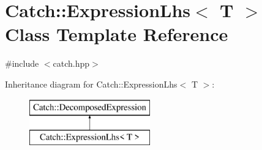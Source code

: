 \hypertarget{class_catch_1_1_expression_lhs}{}\section{Catch\+:\+:Expression\+Lhs$<$ T $>$ Class Template Reference}
\label{class_catch_1_1_expression_lhs}


{\ttfamily \#include $<$catch.\+hpp$>$}

Inheritance diagram for Catch\+:\+:Expression\+Lhs$<$ T $>$\+:\begin{figure}[H]
\begin{center}
\leavevmode
\includegraphics[height=2.000000cm]{class_catch_1_1_expression_lhs}
\end{center}
\end{figure}
